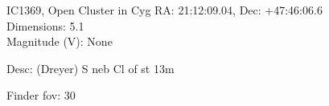 \begin{block}{IC1369, Open Cluster in Cyg}
    RA: 21:12:09.04, Dec: +47:46:06.6 \\ 
    Dimensions: 5.1 \\ 
    Magnitude (V): None


    Desc: (Dreyer) S neb Cl of st 13m 

    Finder fov: 30 

     
\end{block}